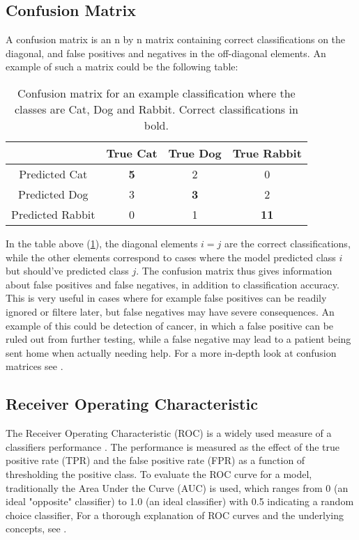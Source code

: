 \subsection{Confusion Matrix}
A confusion matrix is an n by n matrix containing correct classifications
on the diagonal, and false positives and negatives in the off-diagonal elements.
An example of such a matrix could be the following table:
\begin{table}[h]
    \centering
    \begin{tabular}{c|c|c|c}
     & True Cat & True Dog & True Rabbit \\
    \hline
    Predicted Cat & \textbf{5} & 2 & 0 \\
    \hline
    Predicted Dog & 3 & \textbf{3} & 2 \\
    \hline
    Predicted Rabbit & 0 & 1 & \textbf{11} \\
\end{tabular}
\caption{Confusion matrix for an example classification where the classes
         are Cat, Dog and Rabbit. Correct classifications in bold.}
\label{tab:confmat-example}
\end{table}
In the table above (\ref{tab:confmat-example}), the diagonal elements
$i = j$ are the correct classifications, while the other elements correspond
to cases where the model predicted class $i$ but should've predicted class $j$.
The confusion matrix thus gives information about false positives and false
negatives, in addition to classification accuracy. This is very useful
in cases where for example false positives can be readily ignored or filtere
later, but false negatives may have severe consequences. An example of this
could be detection of cancer, in which a false positive can be ruled out
from further testing, while a false negative may lead to a patient being sent
home when actually needing help. For a more in-depth look at confusion matrices
see \cite{Fawcett2006}.

\subsection{Receiver Operating Characteristic}
The Receiver Operating Characteristic (ROC) is a widely used measure of a
classifiers performance . The performance is measured as the effect
of the true positive rate (TPR) and the false positive rate (FPR) as a function
of thresholding the positive class. To evaluate the ROC curve for a model,
traditionally the Area Under the Curve (AUC) is used, which ranges from 0
(an ideal "opposite" classifier) to 1.0 (an ideal classifier) with 0.5
indicating a random choice classifier,
For a thorough explanation of ROC curves and the underlying concepts, see \cite{Fawcett2006}.

